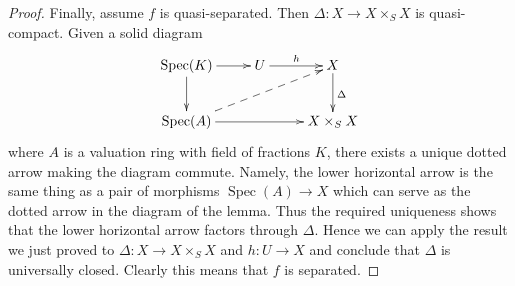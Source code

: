 \documentclass[10pt,a4paper]{amsart}
\theoremstyle{plain}
\theoremstyle{definition}
\theoremstyle{remark}
\numberwithin{equation}{subsection}
\def\Spec{\mathop{\mathrm{Spec}}}
\begin{document}
\begin{proof}
\medskip\noindent
Finally, assume $f$ is quasi-separated. Then $\Delta : X \to X \times_S X$
is quasi-compact. Given a solid diagram
$$
\xymatrix{
\Spec(K) \ar[r] \ar[d] & U \ar[r]^h & X \ar[d]^\Delta \\
\Spec(A) \ar[rr] \ar@{-->}[rru] & & X \times_S X
}
$$
where $A$ is a valuation ring with field of fractions $K$, there
exists a unique dotted arrow making the diagram commute. Namely,
the lower horizontal arrow is the same thing as a pair of morphisms
$\Spec(A) \to X$ which can serve as the dotted arrow in the diagram
of the lemma. Thus the required uniqueness shows that the lower
horizontal arrow factors through $\Delta$.
Hence we can apply the result we just proved to
$\Delta : X \to X \times_S X$ and $h : U \to X$ and conclude that
$\Delta$ is universally closed. Clearly this means that $f$
is separated.
\end{proof}
\end{document}
